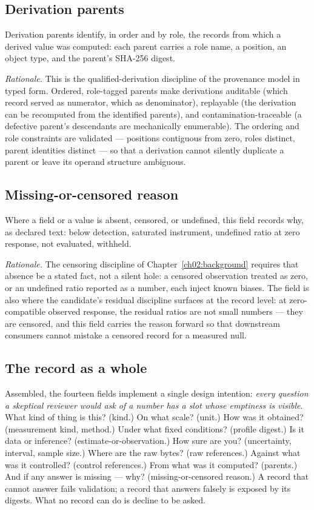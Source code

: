 \subsection{Derivation parents}\label{ch03:field:parents}

Derivation parents identify, in order and by role, the records from which a derived value was computed: each parent carries a role name, a position, an object type, and the parent's SHA-256 digest.

\emph{Rationale.} This is the qualified-derivation discipline of the provenance model \cite{prov} in typed form. Ordered, role-tagged parents make derivations auditable (which record served as numerator, which as denominator), replayable (the derivation can be recomputed from the identified parents), and contamination-traceable (a defective parent's descendants are mechanically enumerable). The ordering and role constraints are validated --- positions contiguous from zero, roles distinct, parent identities distinct --- so that a derivation cannot silently duplicate a parent or leave its operand structure ambiguous.

\subsection{Missing-or-censored reason}\label{ch03:field:missing}

Where a field or a value is absent, censored, or undefined, this field records why, as declared text: below detection, saturated instrument, undefined ratio at zero response, not evaluated, withheld.

\emph{Rationale.} The censoring discipline of Chapter~\ref{ch02:background} requires that absence be a stated fact, not a silent hole: a censored observation treated as zero, or an undefined ratio reported as a number, each inject known biases. The field is also where the candidate's residual discipline surfaces at the record level: at zero-compatible observed response, the residual ratios are not small numbers --- they are censored, and this field carries the reason forward so that downstream consumers cannot mistake a censored record for a measured null.

\subsection{The record as a whole}\label{ch03:field:whole}

Assembled, the fourteen fields implement a single design intention: \emph{every question a skeptical reviewer would ask of a number has a slot whose emptiness is visible}. What kind of thing is this? (kind.) On what scale? (unit.) How was it obtained? (measurement kind, method.) Under what fixed conditions? (profile digest.) Is it data or inference? (estimate-or-observation.) How sure are you? (uncertainty, interval, sample size.) Where are the raw bytes? (raw references.) Against what was it controlled? (control references.) From what was it computed? (parents.) And if any answer is missing --- why? (missing-or-censored reason.) A record that cannot answer fails validation; a record that answers falsely is exposed by its digests. What no record can do is decline to be asked.

